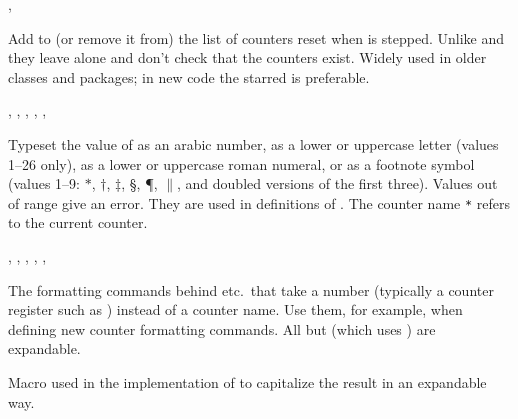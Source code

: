 \documentclass{l3in2edoc}
\begin{document}
\begin{function}[]
  {
    \@addtoreset,
    \@removefromreset
  }
  \begin{syntax}
      
      
  \end{syntax}
  Add  to (or remove it from) the list of counters reset
  when  is stepped. Unlike  and
   they leave  alone and don't
  check that the counters exist. Widely used in older classes and
  packages; in new code the starred  is preferable.
\end{function}




\begin{function}[user]
  {
    \Alph,
    \Roman,
    \alph,
    \arabic,
    \fnsymbol,
    \roman
  }
  \begin{syntax}
     
  \end{syntax}
  Typeset the value of  as an arabic number, as a lower
  or uppercase letter (values 1--26 only), as a lower or uppercase
  roman numeral, or as a footnote symbol (values 1--9: $*$, $\dagger$,
  $\ddagger$, \S, \P, $\|$, and doubled versions of the first three). Values
  out of range give an error. They are used in
  definitions of . The counter name \texttt{*}
  refers to the current counter.
\end{function}



\begin{function}[EXP]
  {
    \@Alph,
    \@Roman,
    \@alph,
    \@arabic,
    \@fnsymbol,
    \@roman
  }
  \begin{syntax}
     
  \end{syntax}
  The formatting commands behind  etc.\ that take a number
  (typically a counter register such as ) instead of a
  counter name. Use them, for example, when defining new counter
  formatting commands. All but  (which uses
  ) are expandable.
\end{function}


\begin{function}[int]
  {
    \@slowromancap
  }
%
  Macro used in the implementation of  to capitalize the
  result in an expandable way.
\end{function}
\end{document}

